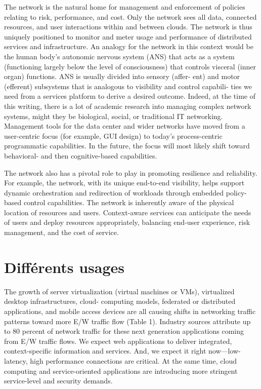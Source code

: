 The network is the natural home for management and enforcement of policies relating to risk, performance, and cost. Only the network sees all data, connected resources, and user interactions within and between clouds. The network is thus uniquely positioned to monitor and meter usage and performance of distributed services and infrastructure. An analogy for the network in this context would be the human body’s autonomic nervous system (ANS) that acts as a system (functioning largely below the level of consciousness) that controls visceral (inner organ) functions. ANS is usually divided into sensory (affer- ent) and motor (efferent) subsystems that is analogous to visibility and control capabili- ties we need from a services platform to derive a desired outcome. Indeed, at the time of this writing, there is a lot of academic research into managing complex network systems, might they be biological, social, or traditional IT networking. Management tools for the data center and wider networks have moved from a user-centric focus (for example, GUI design) to today’s process-centric programmatic capabilities. In the future, the focus will most likely shift toward behavioral- and then cognitive-based capabilities.

The network also has a pivotal role to play in promoting resilience and reliability. For example, the network, with its unique end-to-end visibility, helps support dynamic orchestration and redirection of workloads through embedded policy-based control capabilities. The network is inherently aware of the physical location of resources and users. Context-aware services can anticipate the needs of users and deploy resources appropriately, balancing end-user experience, risk management, and the cost of service.


\section{Différents usages}

The growth of server virtualization (virtual machines or VMs), virtualized desktop infrastructures, cloud- computing models, federated or distributed applications, and mobile access devices are all causing shifts in networking traffic patterns toward more E/W traffic flow (Table 1). Industry sources attribute up to 80 percent of network traffic for these next generation applications coming from E/W traffic flows.
We expect web applications to deliver integrated, context-specific information and services. And, we expect it right now—low-latency, high performance connections are critical. At the same time, cloud computing and service-oriented applications are introducing more stringent service-level and security demands.

